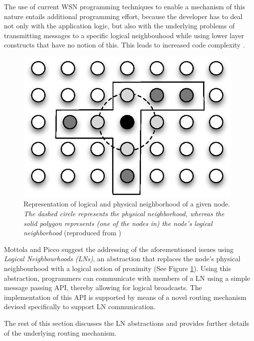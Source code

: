 The use of current WSN programming techniques to enable a mechanism of this
nature entails additional programming effort, because the developer has to deal
not only with the application logic, but also with the underlying problems of
transmitting messages to a specific logical neighbouhood while using lower layer
constructs that have no notion of this. This leads to increased code complexity
\cite{mottola_LN:2006}.

\begin{figure} 
\centering
\includegraphics[scale=0.71]{img/LN_physical_vs_logical.eps} 
\caption[Difference between physical and logical neighborhoods]{Representation 
of logical and physical neighborhood of a given node. \emph{The dashed circle 
represents the physical neighborhood, whereas the solid polygon represents (one 
of the nodes in) the node's logical neighborhood} (reproduced from
\cite{mottola_LN:2006})}
\label{Fig:LN_physical_vs_logical}
\end{figure} 

Mottola and Picco \cite{mottola_LN:2006} suggest the addressing of the
aforementioned issues using \emph{Logical Neighbourhoods (LNs)}, an
abstraction that replaces the node's physical neighbourhood with a logical notion of
proximity (See Figure \ref{Fig:LN_physical_vs_logical}). Using this abstraction, programmers
can communicate with members of a LN using a simple message passing API,
thereby allowing for logical broadcasts. The implementation of this API is
supported by means of a novel routing mechanism devised specifically to support
LN communication.


The rest of this section discusses the LN abstractions and provides further
details of the underlying routing mechanism.

